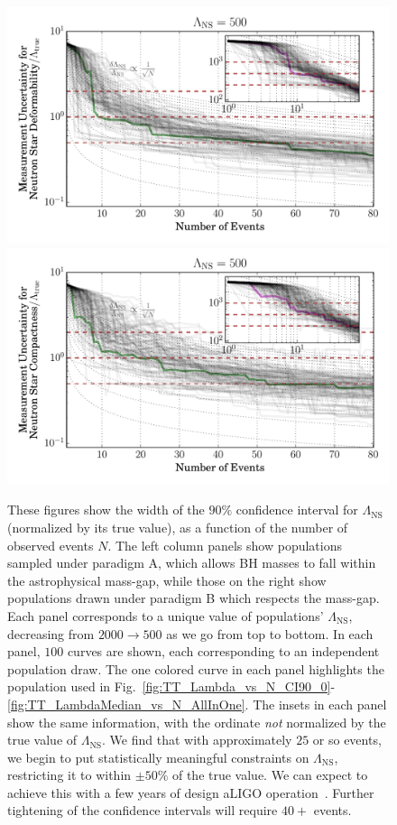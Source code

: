 \documentclass[aps,prd,amsmath,floats,floatfix, twocolumn,
superscriptaddress,nofootinbib,showpacs]{revtex4-1}
\newcommand{\lambdans}{\Lambda_\mathrm{NS}}
\begin{document}
\begin{figure}
\includegraphics[width=0.8\columnwidth]{plots/LambdaCIWidths_vs_N_AllPopulations_Log_L500.pdf}
\includegraphics[width=0.8\columnwidth]{plots/LambdaCIWidths_vs_N_AstroPopulations_Log_L500.pdf}
\caption{%
These figures show the width of the $90\%$ confidence interval for $\lambdans$
(normalized by its true value), as a function of the number of observed events
$N$. The left column panels show populations sampled under paradigm A, which
allows BH masses to fall within the astrophysical mass-gap, while those on the
right show populations drawn under paradigm B which respects the mass-gap.
Each panel corresponds to a unique value of populations' $\lambdans$,
decreasing from $2000\rightarrow 500$ as we go from top to bottom. In each panel,
$100$ curves are shown, each corresponding to an independent population draw. The
one colored curve in each panel highlights the population used in
Fig.~\ref{fig:TT_Lambda_vs_N_CI90_0}-\ref{fig:TT_LambdaMedian_vs_N_AllInOne}.
The insets in each panel show the same information, with the ordinate {\it not}
normalized by the true value of $\lambdans$.
% 
We find that with approximately $25$ or so events, we begin to put
statistically meaningful constraints on $\lambdans$, restricting it to within
$\pm 50\%$ of the true value. We can expect to achieve this with a few years
of design aLIGO operation~\cite{Abadie:2010cfa}. Further tightening of the
confidence intervals will require $40+$ events.
}
\label{fig:TT_LambdaError_vs_N_L500_2000_CI90_0_AllInOne}
\end{figure}
\end{document}
